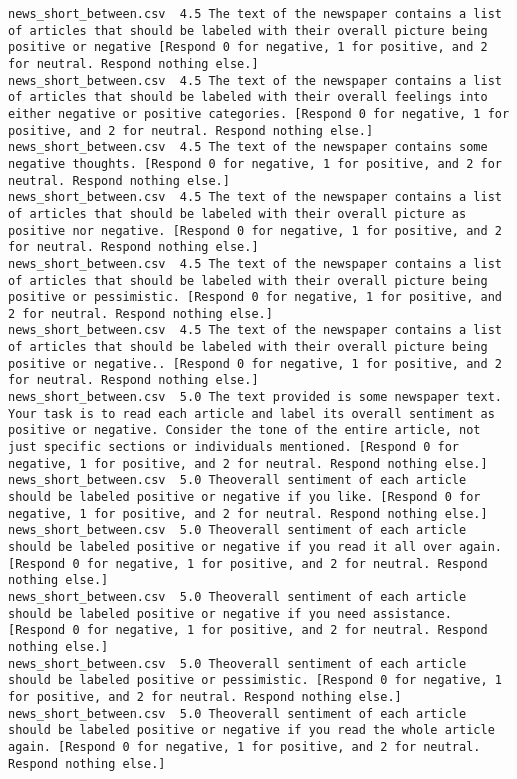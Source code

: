 \begin{lstlisting}[label=lst:promptvariants]
news_short_between.csv	4.5	The text of the newspaper contains a list of articles that should be labeled with their overall picture being positive or negative [Respond 0 for negative, 1 for positive, and 2 for neutral. Respond nothing else.]
news_short_between.csv	4.5	The text of the newspaper contains a list of articles that should be labeled with their overall feelings into either negative or positive categories. [Respond 0 for negative, 1 for positive, and 2 for neutral. Respond nothing else.]
news_short_between.csv	4.5	The text of the newspaper contains some negative thoughts. [Respond 0 for negative, 1 for positive, and 2 for neutral. Respond nothing else.]
news_short_between.csv	4.5	The text of the newspaper contains a list of articles that should be labeled with their overall picture as positive nor negative. [Respond 0 for negative, 1 for positive, and 2 for neutral. Respond nothing else.]
news_short_between.csv	4.5	The text of the newspaper contains a list of articles that should be labeled with their overall picture being positive or pessimistic. [Respond 0 for negative, 1 for positive, and 2 for neutral. Respond nothing else.]
news_short_between.csv	4.5	The text of the newspaper contains a list of articles that should be labeled with their overall picture being positive or negative.. [Respond 0 for negative, 1 for positive, and 2 for neutral. Respond nothing else.]
news_short_between.csv	5.0	The text provided is some newspaper text. Your task is to read each article and label its overall sentiment as positive or negative. Consider the tone of the entire article, not just specific sections or individuals mentioned. [Respond 0 for negative, 1 for positive, and 2 for neutral. Respond nothing else.]
news_short_between.csv	5.0	Theoverall sentiment of each article should be labeled positive or negative if you like. [Respond 0 for negative, 1 for positive, and 2 for neutral. Respond nothing else.]
news_short_between.csv	5.0	Theoverall sentiment of each article should be labeled positive or negative if you read it all over again. [Respond 0 for negative, 1 for positive, and 2 for neutral. Respond nothing else.]
news_short_between.csv	5.0	Theoverall sentiment of each article should be labeled positive or negative if you need assistance. [Respond 0 for negative, 1 for positive, and 2 for neutral. Respond nothing else.]
news_short_between.csv	5.0	Theoverall sentiment of each article should be labeled positive or pessimistic. [Respond 0 for negative, 1 for positive, and 2 for neutral. Respond nothing else.]
news_short_between.csv	5.0	Theoverall sentiment of each article should be labeled positive or negative if you read the whole article again. [Respond 0 for negative, 1 for positive, and 2 for neutral. Respond nothing else.]

\end{lstlisting}
